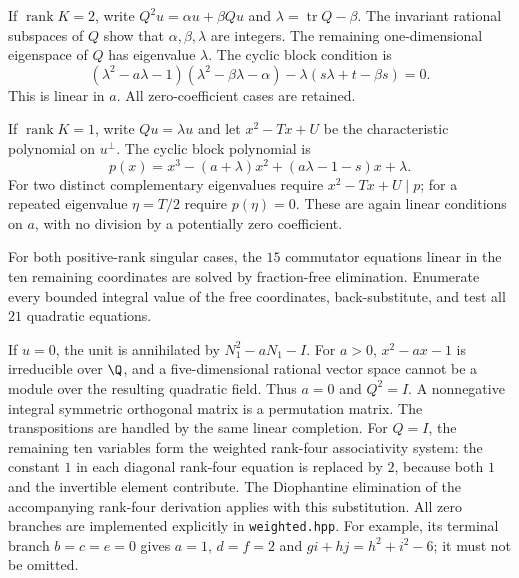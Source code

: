 If $\operatorname{rank}K=2$, write $Q^2u=\alpha u+\beta Qu$ and
$\lambda=\operatorname{tr}Q-\beta$. The invariant rational subspaces of
$Q$ show that $\alpha,\beta,\lambda$ are integers. The remaining
one-dimensional eigenspace of $Q$ has eigenvalue $\lambda$. The cyclic
block condition is
\begin{equation}\label{eq:ranktwo}
(\lambda^2-a\lambda-1)(\lambda^2-\beta\lambda-\alpha)
-\lambda(s\lambda+t-\beta s)=0.
\end{equation}
This is linear in $a$. All zero-coefficient cases are retained.

If $\operatorname{rank}K=1$, write $Qu=\lambda u$ and let
$x^2-Tx+U$ be the characteristic polynomial on $u^\perp$.
The cyclic block polynomial is
\[
p(x)=x^3-(a+\lambda)x^2+(a\lambda-1-s)x+\lambda.
\]
For two distinct complementary eigenvalues require $x^2-Tx+U\mid p$;
for a repeated eigenvalue $\eta=T/2$ require $p(\eta)=0$.
These are again linear conditions on $a$, with no division by a
potentially zero coefficient.

For both positive-rank singular cases, the $15$ commutator equations
linear in the ten remaining coordinates are solved by fraction-free
elimination. Enumerate every bounded integral value of the free
coordinates, back-substitute, and test all $21$ quadratic equations.

If $u=0$, the unit is annihilated by $N_1^2-aN_1-I$.
For $a>0$, $x^2-ax-1$ is irreducible over $\Q$, and a five-dimensional
rational vector space cannot be a module over the resulting quadratic
field. Thus $a=0$ and $Q^2=I$. A nonnegative integral symmetric
orthogonal matrix is a permutation matrix. The transpositions are
handled by the same linear completion. For $Q=I$, the remaining ten
variables form the weighted rank-four associativity system: the constant
$1$ in each diagonal rank-four equation is replaced by $2$, because
both $1$ and the invertible element contribute. The Diophantine
elimination of the accompanying rank-four derivation applies with this substitution.
All zero branches are implemented explicitly in \texttt{weighted.hpp}.
For example, its terminal branch $b=c=e=0$ gives $a=1$, $d=f=2$ and
$gi+hj=h^2+i^2-6$; it must not be omitted.

